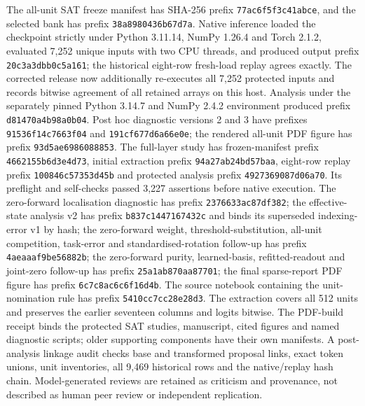 \documentclass[
  british,
  11pt,
  a4paper,
]{article}
\begin{document}
The all-unit SAT freeze manifest has SHA-256 prefix
\texttt{77ac6f5f3c41abce}, and the selected bank has prefix
\texttt{38a8980436b67d7a}. Native inference loaded the checkpoint
strictly under Python 3.11.14, NumPy 1.26.4 and Torch 2.1.2, evaluated
7,252 unique inputs with two CPU threads, and produced output prefix
\texttt{20c3a3dbb0c5a161}; the historical eight-row fresh-load replay
agrees exactly. The corrected release now additionally re-executes all
7,252 protected inputs and records bitwise agreement of all retained
arrays on this host. Analysis under the separately pinned Python 3.14.7
and NumPy 2.4.2 environment produced prefix \texttt{d81470a4b98a0b04}.
Post hoc diagnostic versions 2 and 3 have prefixes
\texttt{91536f14c7663f04} and \texttt{191cf677d6a66e0e}; the rendered
all-unit PDF figure has prefix \texttt{93d5ae6986088853}. The full-layer
study has frozen-manifest prefix \texttt{4662155b6d3e4d73}, initial
extraction prefix \texttt{94a27ab24bd57baa}, eight-row replay prefix
\texttt{100846c57353d45b} and protected analysis prefix
\texttt{4927369087d06a70}. Its preflight and self-checks passed 3,227
assertions before native execution. The zero-forward localisation
diagnostic has prefix \texttt{2376633ac87df382}; the effective-state
analysis v2 has prefix \texttt{b837c1447167432c} and binds its
superseded indexing-error v1 by hash; the zero-forward weight,
threshold-substitution, all-unit competition, task-error and
standardised-rotation follow-up has prefix \texttt{4aeaaaf9be56882b};
the zero-forward purity, learned-basis, refitted-readout and joint-zero
follow-up has prefix \texttt{25a1ab870aa87701}; the final sparse-report
PDF figure has prefix \texttt{6c7c8ac6c6f16d4b}. The source notebook
containing the unit-nomination rule has prefix
\texttt{5410cc7cc28e28d3}. The extraction covers all 512 units and
preserves the earlier seventeen columns and logits bitwise. The
PDF-build receipt binds the protected SAT studies, manuscript, cited
figures and named diagnostic scripts; older supporting components have
their own manifests. A post-analysis linkage audit checks base and
transformed proposal links, exact token unions, unit inventories, all
9,469 historical rows and the native/replay hash chain. Model-generated
reviews are retained as criticism and provenance, not described as human
peer review or independent replication.
\end{document}
